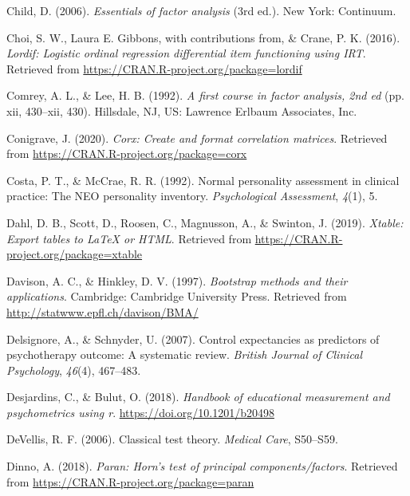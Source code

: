 \documentclass[
  english,
  man]{apa6}
\newlength{\cslhangindent}
\newlength{\cslentryspacingunit} %
\newenvironment{CSLReferences}[2] %
 {%
  \setlength{\parindent}{0pt}
  \ifodd #1
  \let\oldpar\par
  \def\par{\hangindent=\cslhangindent\oldpar}
  \fi
  \setlength{\parskip}{#2\cslentryspacingunit}
 }%
 {}
\begin{document}
\begin{CSLReferences}{1}{0}
\leavevmode{}%
Child, D. (2006). \emph{Essentials of factor analysis} (3rd ed.). New York: Continuum.

\leavevmode{}%
Choi, S. W., Laura E. Gibbons, with contributions from, \& Crane, P. K. (2016). \emph{Lordif: Logistic ordinal regression differential item functioning using IRT}. Retrieved from \url{https://CRAN.R-project.org/package=lordif}

\leavevmode{}%
Comrey, A. L., \& Lee, H. B. (1992). \emph{A first course in factor analysis, 2nd ed} (pp. xii, 430--xii, 430). Hillsdale, NJ, US: Lawrence Erlbaum Associates, Inc.

\leavevmode{}%
Conigrave, J. (2020). \emph{Corx: Create and format correlation matrices}. Retrieved from \url{https://CRAN.R-project.org/package=corx}

\leavevmode{}%
Costa, P. T., \& McCrae, R. R. (1992). Normal personality assessment in clinical practice: The NEO personality inventory. \emph{Psychological Assessment}, \emph{4}(1), 5.

\leavevmode{}%
Dahl, D. B., Scott, D., Roosen, C., Magnusson, A., \& Swinton, J. (2019). \emph{Xtable: Export tables to LaTeX or HTML}. Retrieved from \url{https://CRAN.R-project.org/package=xtable}

\leavevmode{}%
Davison, A. C., \& Hinkley, D. V. (1997). \emph{Bootstrap methods and their applications}. Cambridge: Cambridge University Press. Retrieved from \url{http://statwww.epfl.ch/davison/BMA/}

\leavevmode{}%
Delsignore, A., \& Schnyder, U. (2007). Control expectancies as predictors of psychotherapy outcome: A systematic review. \emph{British Journal of Clinical Psychology}, \emph{46}(4), 467--483.

\leavevmode{}%
Desjardins, C., \& Bulut, O. (2018). \emph{Handbook of educational measurement and psychometrics using r}. \url{https://doi.org/10.1201/b20498}

\leavevmode{}%
DeVellis, R. F. (2006). Classical test theory. \emph{Medical Care}, S50--S59.

\leavevmode{}%
Dinno, A. (2018). \emph{Paran: Horn's test of principal components/factors}. Retrieved from \url{https://CRAN.R-project.org/package=paran}


\end{CSLReferences}
\end{document}
